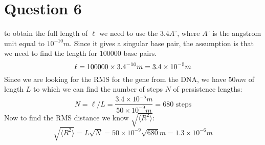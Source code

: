 \documentclass[11pt]{article}
\def\l{\ell}
\def\la{\langle}
\def\ra{\rangle}
\theoremstyle{pink}
\theoremstyle{boxedsolution}
\theoremstyle{definition}
\theoremstyle{claim}
\begin{document}
 \newpage
 \section*{Question 6}
to obtain the full length of $\l$ we need to use the $3.4 A^\circ$, where $A^\circ$ is the angstrom unit equal to $10^{-10}m$. Since it gives a singular base pair, the assumption is that we need to find the length for $100000$ base pairs.
\[\l=100000 \times 3.4\time10^{-10}m=3.4\times10^{-5}m\]
Since we are looking for the RMS for the gene from the DNA, we have $50nm$ of length $L$ to which we can find the number of steps $N$ of persistence lengths:
\[N=\l/L=\frac{3.4\times10^{-5}m}{50\times 10^{-9}m}=680 \text{ steps}\]
Now to find the RMS distance we know $\sqrt{\la R^2\ra}$:
\[\sqrt{\la R^2\ra}=L\sqrt{N}=50\times10^{-9}\sqrt{680}m=1.3\times10^{-6}m\]
\end{document}
